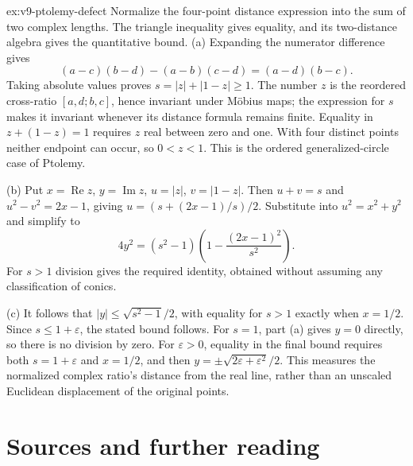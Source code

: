 \begin{solution}{ex:v9-ptolemy-defect}
\idea Normalize the four-point distance expression into the sum of two complex lengths. The triangle inequality gives equality, and its two-distance algebra gives the quantitative bound.
\writeup (a) Expanding the numerator difference gives
\[
(a-c)(b-d)-(a-b)(c-d)=(a-d)(b-c).
\]
Taking absolute values proves $s=|z|+|1-z|\ge1$. The number $z$ is the reordered cross-ratio $[a,d;b,c]$, hence invariant under M\"obius maps; the expression for $s$ makes it invariant whenever its distance formula remains finite. Equality in $z+(1-z)=1$ requires $z$ real between zero and one. With four distinct points neither endpoint can occur, so $0<z<1$. This is the ordered generalized-circle case of Ptolemy.

(b) Put $x=\operatorname{Re}z$, $y=\operatorname{Im}z$, $u=|z|$, $v=|1-z|$. Then $u+v=s$ and $u^2-v^2=2x-1$, giving $u=(s+(2x-1)/s)/2$. Substitute into $u^2=x^2+y^2$ and simplify to
\[
4y^2=(s^2-1)\left(1-\frac{(2x-1)^2}{s^2}\right).
\]
For $s>1$ division gives the required identity, obtained without assuming any classification of conics.

(c) It follows that $|y|\le\sqrt{s^2-1}/2$, with equality for $s>1$ exactly when $x=1/2$. Since $s\le1+\varepsilon$, the stated bound follows. For $s=1$, part (a) gives $y=0$ directly, so there is no division by zero. For $\varepsilon>0$, equality in the final bound requires both $s=1+\varepsilon$ and $x=1/2$, and then $y=\pm\sqrt{2\varepsilon+\varepsilon^2}/2$. This measures the normalized complex ratio's distance from the real line, rather than an unscaled Euclidean displacement of the original points.
\end{solution}

\section*{Sources and further reading}

